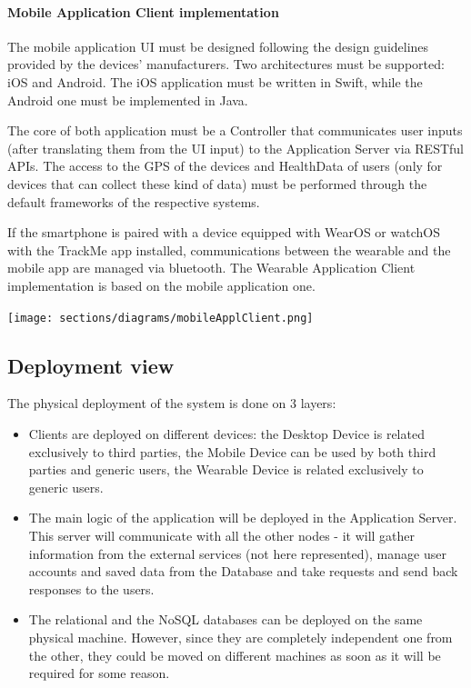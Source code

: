 \paragraph*{Mobile Application Client implementation}
The mobile application UI must be designed following the design guidelines provided by the devices’ manufacturers. Two architectures must be supported: iOS and Android. The iOS application must be written in Swift, while the Android one must be implemented in Java.

The core of both application must be a Controller that communicates user inputs (after translating them from the UI input) to the Application Server via RESTful APIs. The access to the GPS of the devices and HealthData of users (only for devices that can collect these kind of data) must be performed through the default frameworks of the respective systems.

If the smartphone is paired with a device equipped with WearOS or watchOS with the TrackMe app installed, communications between the wearable and the mobile app are managed via bluetooth. The Wearable Application Client implementation is based on the mobile application one.

\begin{center}
\texttt{[image: sections/diagrams/mobileApplClient.png]}
\newline
{}
\end{center}

\subsection{Deployment view}
The physical deployment of the system is done on 3 layers:
\begin{itemize}
\item Clients are deployed on different devices: the Desktop Device is related exclusively to third parties, the Mobile Device can be used by both third parties and generic users, the Wearable Device is related exclusively to generic users.

\item  The main logic of the application will be deployed in the Application Server. This server will communicate with all the other nodes - it will gather information from the external services (not here represented), manage user accounts and saved data from the Database and take requests and send back responses to the users.

\item The relational and the NoSQL databases can be deployed on the same physical machine. However, since they are completely independent one from the other, they could be moved on different machines as soon as it will be required for some reason.
\end{itemize}


